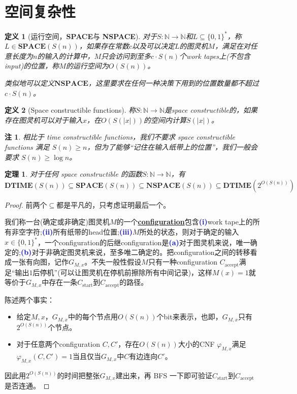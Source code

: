 \documentclass[8pt]{article}
\theoremstyle{compact}
\newtheorem{theorem}{定理}
\newtheorem{definition}{定义}
\newtheorem{remark}{注}
\def\obj#1{\textbf{\uline{#1}}}
\def\num#1{\textnormal{\textbf{\mbox{\textcolor{blue}{(#1)}}}}}
\def\ge{\geqslant}
\def\DTIME{\textbf{DTIME}}
\def\SPACE{\textbf{SPACE}}
\def\NSPACE{\textbf{NSPACE}}
\begin{document}
\section{空间复杂性}
\begin{definition}[运行空间，\SPACE 与 \NSPACE]
	对于$S: \mathbb N \to \mathbb N$和$L \subseteq \{0, 1\}^*$，称$L \in \SPACE(S(n))$，如果存在常数$c$以及可以决定$L$的图灵机$M$，满足在对任意长度为$n$的输入的计算中，$M$只会访问到至多$c \cdot S(n)$个work tapes上(不包含input)的位置，称$M$的运行空间为$O(S(n))$。

	类似地可以定义$\NSPACE$，这里要求在任何一种决策下用到的位置数量都不超过$c \cdot S(n)$。
\end{definition}
\begin{definition}[Space constructible functions]
	称$S: \mathbb N \to \mathbb N$是space constructible的，如果存在图灵机可以对于输入$x$，在$O(S(|x|))$的空间内计算$S(|x|)$。
\end{definition}
\begin{remark}
	相比于 time constructible functions，我们不要求 space constructible functions 满足 $S(n) \ge n$，但为了能够“记住在输入纸带上的位置”，我们一般会要求 $S(n) \ge \log n$。
\end{remark}
\begin{theorem}
	对于任何 space constructible 的函数$S: \mathbb N \to \mathbb N$，有
	$$\DTIME(S(n)) \subseteq \SPACE(S(n)) \subseteq \NSPACE(S(n)) \subseteq \DTIME(2^{O(S(n))})$$
	\label{time_and_space}
\end{theorem}
\begin{proof}
	前两个$\subseteq$都是平凡的，只考虑证明最后一个。

	我们称一台(确定或非确定)图灵机$M$的一个\obj{configuration}包含\num{i}work tape上的所有非空字符;\num{ii}所有纸带的head位置;\num{iii}$M$所处的状态，则对于确定的输入$x \in \{0, 1\}^*$，一个configuration的后继configuration是\num{a}对于图灵机来说，唯一确定的;\num{b}对于非确定图灵机来说，至多唯二确定的。把configuration之间的转移看成一张有向图，记作$G_{M, x}$。不失一般性假设$M$只有一种configuration $C_{\text{accept}}$满足“输出$1$后停机”(可以让图灵机在停机前擦除所有中间记录)，这样$M(x) = 1$就等价于$G_{M, x}$中存在一条$C_{\text{start}}$到$C_{\text{accept}}$的路径。

	陈述两个事实：
	\begin{itemize}
		\item 给定$M, x$，$G_{M, x}$中的每个节点用$O(S(n))$个bit来表示，也即，$G_{M, x}$只有$2^{O(S(n))}$个节点。
		\item 对于任意两个configuration $C, C'$，存在$O(S(n))$大小的CNF $\varphi_{M, x}$满足$\varphi_{M, x}(C, C') = 1$当且仅当$G_{M, x}$中$C$有边连向$C'$。
	\end{itemize}

	因此用$2^{O(S(n))}$的时间把整张$G_{M, x}$建出来，再 BFS 一下即可验证$C_{\text{start}}$到$C_{\text{accept}}$是否连通。
\end{proof}
\end{document}
